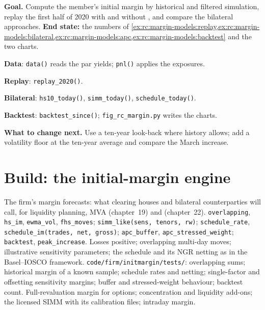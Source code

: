 \begin{tutorial}
\textbf{Goal.} Compute the member's initial margin by historical and filtered simulation, replay the
first half of 2020 with and without , and compare the bilateral approaches.
\textbf{End state:} the numbers of
\cref{ex:rc:margin-models:replay,ex:rc:margin-models:bilateral,ex:rc:margin-models:apc,ex:rc:margin-models:backtest}
and the two charts.
\begin{tutsteps}
\item \textbf{Data}: \texttt{data()} reads the par yields; \texttt{pnl()} applies the exposures.
\item \textbf{Replay}: \texttt{replay\_2020()}.
\item \textbf{Bilateral}: \texttt{hs10\_today()}, \texttt{simm\_today()}, \texttt{schedule\_today()}.
\item \textbf{Backtest}: \texttt{backtest\_since()}; \texttt{fig\_rc\_margin.py} writes the charts.
\end{tutsteps}
\textbf{What to change next.} Use a ten-year look-back where history allows; add a volatility floor
at the ten-year average and compare the March increase.
\end{tutorial}

\section{Build: the initial-margin engine}\label{bld:rc:margin-models:initmargin}

\begin{build}
 The firm's margin forecasts: what clearing houses and bilateral counterparties will
call, for liquidity planning, MVA (chapter~19) and  (chapter~22).
 \texttt{overlapping}, \texttt{hs\_im}, \texttt{ewma\_vol}, \texttt{fhs\_moves};
\texttt{simm\_like(sens, tenors, rw)}; \texttt{schedule\_rate}, \texttt{schedule\_im(trades, net,
gross)}; \texttt{apc\_buffer}, \texttt{apc\_stressed\_weight}; \texttt{backtest}, \texttt{peak\_increase}.
 Losses positive; overlapping multi-day moves; illustrative sensitivity parameters;
the schedule and its NGR netting as in the Basel--IOSCO framework.
 \texttt{code/firm/initmargin/tests/}: overlapping sums; historical margin
of a known sample; schedule rates and netting; single-factor and offsetting sensitivity margins; buffer
and stressed-weight behaviour; backtest count.
 Full-revaluation margin for options; concentration and liquidity add-ons; the licensed
SIMM with its calibration files; intraday margin.
\end{build}

